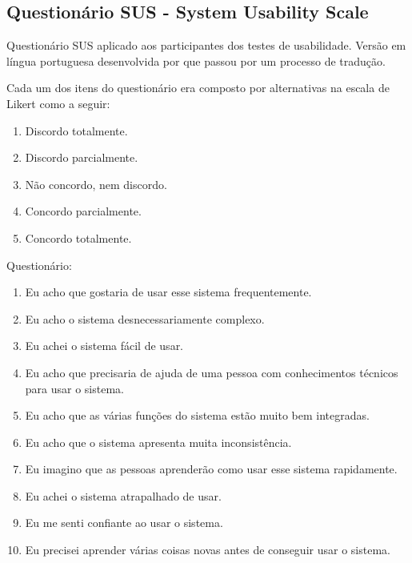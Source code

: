 \begin{apendicesenv}

\partapendices



\chapter{Questionário SUS - System Usability Scale}\label{appendix:sus}

Questionário SUS aplicado aos participantes dos testes de usabilidade.
Versão em língua portuguesa desenvolvida por \cite{tenorio2010desenvolvimento} que passou por um processo
de tradução.

Cada um dos itens do questionário era composto por alternativas na escala de Likert como a seguir:
\begin{enumerate}
  \item Discordo totalmente.
  \item Discordo parcialmente.
  \item Não concordo, nem discordo.
  \item Concordo parcialmente.
  \item Concordo totalmente.
\end{enumerate}
Questionário:
\begin{enumerate}
  \item
  Eu acho que gostaria de usar esse sistema frequentemente.
  \item
  Eu acho o sistema desnecessariamente complexo.
  \item
  Eu achei o sistema fácil de usar.
  \item
  Eu acho que precisaria de ajuda de uma pessoa com conhecimentos técnicos para usar o sistema.
  \item
  Eu acho que as várias funções do sistema estão muito bem integradas.
  \item
  Eu acho que o sistema apresenta muita inconsistência.
  \item
  Eu imagino que as pessoas aprenderão como usar esse sistema rapidamente.
  \item
  Eu achei o sistema atrapalhado de usar.
  \item
  Eu me senti confiante ao usar o sistema.
  \item
  Eu precisei aprender várias coisas novas antes de conseguir usar o sistema.
\end{enumerate}


\end{apendicesenv}
